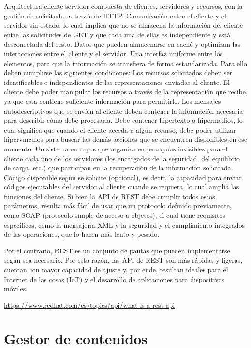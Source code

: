 Arquitectura cliente-servidor compuesta de clientes, servidores y recursos, con la gestión de solicitudes a través de HTTP.
Comunicación entre el cliente y el servidor sin estado, lo cual implica que no se almacena la información del cliente entre las solicitudes de GET y que cada una de ellas es independiente y está desconectada del resto.
Datos que pueden almacenarse en caché y optimizan las interacciones entre el cliente y el servidor.
Una interfaz uniforme entre los elementos, para que la información se transfiera de forma estandarizada. Para ello deben cumplirse las siguientes condiciones:
Los recursos solicitados deben ser identificables e independientes de las representaciones enviadas al cliente.
El cliente debe poder manipular los recursos a través de la representación que recibe, ya que esta contiene suficiente información para permitirlo.
Los mensajes autodescriptivos que se envíen al cliente deben contener la información necesaria para describir cómo debe procesarla.
Debe contener hipertexto o hipermedios, lo cual significa que cuando el cliente acceda a algún recurso, debe poder utilizar hipervínculos para buscar las demás acciones que se encuentren disponibles en ese momento.
Un sistema en capas que organiza en jerarquías invisibles para el cliente cada uno de los servidores (los encargados de la seguridad, del equilibrio de carga, etc.) que participan en la recuperación de la información solicitada.
Código disponible según se solicite (opcional), es decir, la capacidad para enviar códigos ejecutables del servidor al cliente cuando se requiera, lo cual amplía las funciones del cliente. 
Si bien la API de REST debe cumplir todos estos parámetros, resulta más fácil de usar que un protocolo definido previamente, como SOAP (protocolo simple de acceso a objetos), el cual tiene requisitos específicos, como la mensajería XML y la seguridad y el cumplimiento integrados de las operaciones, que lo hacen más lento y pesado. 

Por el contrario, REST es un conjunto de pautas que pueden implementarse según sea necesario. Por esta razón, las API de REST son más rápidas y ligeras, cuentan con mayor capacidad de ajuste y, por ende, resultan ideales para el Internet de las cosas (IoT) y el desarrollo de aplicaciones para dispositivos móviles. 

\url{https://www.redhat.com/es/topics/api/what-is-a-rest-api}



\section{Gestor de contenidos}

